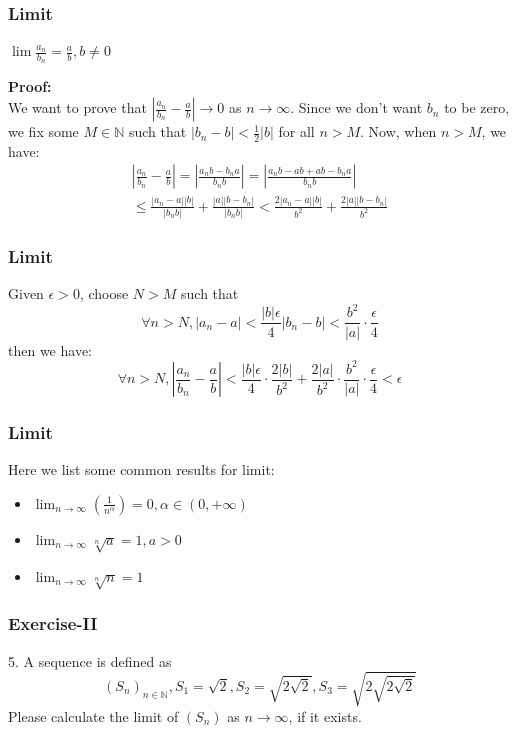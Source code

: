 \documentclass[12pt, t]{beamer}
\begin{document}
\begin{frame}
    \frametitle{Limit}
    \begin{center}
        $\lim \frac{a_n}{b_n}=\frac{a}{b}, b\neq 0$
    \end{center}
    \textbf{Proof:}\\
    \hspace{1em} We want to prove that $|\frac{a_n}{b_n}-\frac{a}{b}|\rightarrow 0$ as $n\rightarrow \infty$.
    Since we don't want $b_n$ to be zero, we fix some $M\in \mathbb{N}$ such that $|b_n-b|<\frac{1}{2}|b|$ for
    all $n>M$. Now, when $n>M$, we have:
    \begin{multline*}
        |\frac{a_n}{b_n}-\frac{a}{b}|
        = |\frac{a_nb-b_na}{b_nb}|=|\frac{a_nb-ab+ab-b_na}{b_nb}| \\
        \leq \frac{|a_n-a||b|}{|b_nb|}+\frac{|a||b-b_n|}{|b_nb|}
        <\frac{2|a_n-a||b|}{b^2}+\frac{2|a||b-b_n|}{b^2}
    \end{multline*}
\end{frame}

\begin{frame}
    \frametitle{Limit}
    \hspace{1em} Given $\epsilon >0$, choose $N>M$ such that
    \begin{equation*}
        \forall n> N, |a_n-a|<\frac{|b|\epsilon}{4}|b_n-b|<\frac{b^2}{|a|}\cdot \frac{\epsilon}{4}
    \end{equation*}
    then we have:
    \begin{equation*}
        \forall n>N, |\frac{a_n}{b_n}-\frac{a}{b}|<\frac{|b|\epsilon}{4}\cdot\frac{2|b|}{b^2}+\frac{2|a|}{b^2}\cdot \frac{b^2}{|a|}\cdot \frac{\epsilon}{4}<\epsilon
    \end{equation*}
\end{frame}

\begin{frame}
    \frametitle{Limit}
    Here we list some common results for limit:
    \begin{itemize}
        \item $\lim_{n\rightarrow \infty} (\frac{1}{n^\alpha})=0,\alpha \in (0,+\infty)$
        \item $\lim_{n\rightarrow \infty} \sqrt[n]{a}=1, a>0$
        \item $\lim_{n\rightarrow \infty} \sqrt[n]{n}=1$
    \end{itemize}
\end{frame}

\begin{frame}
    \frametitle{Exercise-II}
    5. A sequence is defined as
    \begin{equation*}
        (S_n)_{n\in\mathbb{N}}, S_1=\sqrt{2}, S_2=\sqrt{2\sqrt{2}}, S_3=\sqrt{2\sqrt{2\sqrt{2}}}
    \end{equation*}
    Please calculate the limit of $(S_n)$ as $n\rightarrow \infty$, if it exists.
\end{frame}
\end{document}
